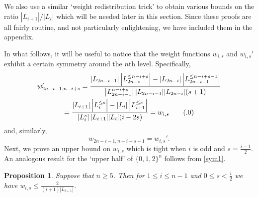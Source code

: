\documentclass[11 pt]{article}
\newtheorem{prop}[equation]{Proposition}
\theoremstyle{definition}
\theoremstyle{case}
\numberwithin{equation}{section}
\newcommand\numberthis{\addtocounter{equation}{1}\tag{\theequation}}
\begin{document}
We also use a similar `weight redistribution trick' to obtain various bounds on the ratio $|L_{i+1}|/|L_i|$ which will be needed later in this section. Since these proofs are all fairly routine, and not particularly enlightening, we have included them in the appendix.

In what follows, it will be useful to notice that the weight functions $w_{i,s}$ and $w_{i,s}'$ exhibit a certain symmetry around the $n$th level. Specifically,
\begin{gather*} w_{2n-i-1,n-i+s}' = \frac{\left|L_{2n-i-1}\right|\left|L_{2n-i}^{\leq n-i+s}\right|- \left|L_{2n-i}\right|\left|L_{2n-i-1}^{\leq n-i+s-1}\right|}{\left|L_{2n-i-1}^{n-i+s}\right||L_{2n-i-1}||L_{2n-i}|(s+1)}
\\ = \frac{\left|L_{i+1}\right|\left|L_{i}^{\leq s}\right|- \left|L_{i}\right|\left|L_{i+1}^{\leq s}\right|}{\left|L_{i}^{s}\right||L_{i+1}||L_{i}|(i-2s)}
 =w_{i,s}\numberthis\label{sym1}\end{gather*}
and, similarly,
\begin{equation}\label{sym2} w_{2n-i-1,n-i+s-1}=w_{i,s}'.\end{equation}
Next, we prove an upper bound on $w_{i,s}$ which is tight when $i$ is odd and $s=\frac{i-1}{2}$. An analogous result for the `upper half' of $\{0,1,2\}^n$ follows from \eqref{sym1}.

\begin{prop}
\label{wMaxBoth}
Suppose that $n\geq5$. Then for $1\leq i\leq n-1$ and $0\leq s < \frac{i}{2}$ we have $w_{i,s}\leq \frac{2}{(i+1)\left|L_{i+1}\right|}$.
\end{prop}
\end{document}
